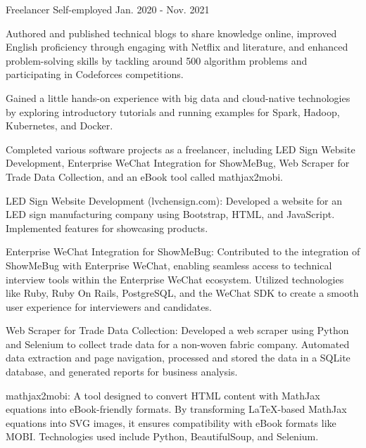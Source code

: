 \begin{cventries}
\cventry
{Freelancer} %
{Self-employed} %
{} %
{Jan. 2020 - Nov. 2021} %
{
  \begin{cvitems} %
    \item {Authored and published technical blogs to share knowledge online, improved English proficiency through engaging with Netflix and literature, and enhanced problem-solving skills by tackling around 500 algorithm problems and participating in Codeforces competitions.}
    \item {Gained a little hands-on experience with big data and cloud-native technologies by exploring introductory tutorials and running examples for Spark, Hadoop, Kubernetes, and Docker.}
    \item {Completed various software projects as a freelancer, including LED Sign Website Development, Enterprise WeChat Integration for ShowMeBug, Web Scraper for Trade Data Collection, and an eBook tool called mathjax2mobi.}
    \item {LED Sign Website Development (lvchensign.com): Developed a website for an LED sign manufacturing company using Bootstrap, HTML, and JavaScript. Implemented features for showcasing products.}
    \item {Enterprise WeChat Integration for ShowMeBug: Contributed to the integration of ShowMeBug with Enterprise WeChat, enabling seamless access to technical interview tools within the Enterprise WeChat ecosystem. Utilized technologies like Ruby, Ruby On Rails, PostgreSQL, and the WeChat SDK to create a smooth user experience for interviewers and candidates.}
    \item {Web Scraper for Trade Data Collection: Developed a web scraper using Python and Selenium to collect trade data for a non-woven fabric company. Automated data extraction and page navigation, processed and stored the data in a SQLite database, and generated reports for business analysis.}
    \item {mathjax2mobi: A tool designed to convert HTML content with MathJax equations into eBook-friendly formats. By transforming LaTeX-based MathJax equations into SVG images, it ensures compatibility with eBook formats like MOBI. Technologies used include Python, BeautifulSoup, and Selenium.}
  \end{cvitems}
}


\end{cventries}
